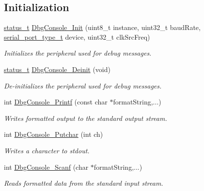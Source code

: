 \subsection*{Initialization}
\begin{DoxyCompactItemize}
\item 
\mbox{\hyperlink{group__ksdk__common_gaaabdaf7ee58ca7269bd4bf24efcde092}{status\+\_\+t}} \mbox{\hyperlink{group__debugconsole_ga12e50ee0450679fd8ca950a89338d366}{Dbg\+Console\+\_\+\+Init}} (uint8\+\_\+t instance, uint32\+\_\+t baud\+Rate, \mbox{\hyperlink{group__serialmanager_gaa7dc5f93aacda72d14bb0fa66b0401f3}{serial\+\_\+port\+\_\+type\+\_\+t}} device, uint32\+\_\+t clk\+Src\+Freq)
\begin{DoxyCompactList}\small\item\em Initializes the peripheral used for debug messages. \end{DoxyCompactList}\item 
\mbox{\hyperlink{group__ksdk__common_gaaabdaf7ee58ca7269bd4bf24efcde092}{status\+\_\+t}} \mbox{\hyperlink{group__debugconsole_gad80e7aa70bbb3fce1a9168621372833e}{Dbg\+Console\+\_\+\+Deinit}} (void)
\begin{DoxyCompactList}\small\item\em De-\/initializes the peripheral used for debug messages. \end{DoxyCompactList}\item 
int \mbox{\hyperlink{group__debugconsole_ga1019139ac1c69fd62687250130c6ca7f}{Dbg\+Console\+\_\+\+Printf}} (const char $\ast$format\+String,...)
\begin{DoxyCompactList}\small\item\em Writes formatted output to the standard output stream. \end{DoxyCompactList}\item 
int \mbox{\hyperlink{group__debugconsole_gada572d86a06f028b5b1a5d0440f683e3}{Dbg\+Console\+\_\+\+Putchar}} (int ch)
\begin{DoxyCompactList}\small\item\em Writes a character to stdout. \end{DoxyCompactList}\item 
int \mbox{\hyperlink{group__debugconsole_ga6d87d10b03e4aaf8464206fe3829dd28}{Dbg\+Console\+\_\+\+Scanf}} (char $\ast$format\+String,...)
\begin{DoxyCompactList}\small\item\em Reads formatted data from the standard input stream. \end{DoxyCompactList}\item 

\end{DoxyCompactItemize}

